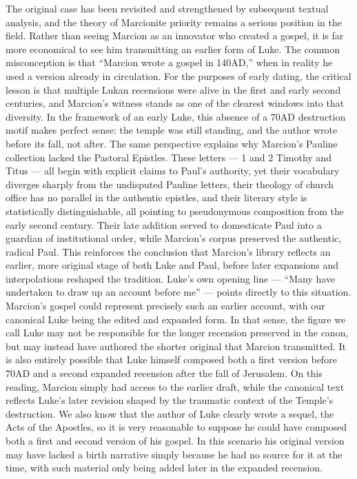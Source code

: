 The original case has been revisited and strengthened by subsequent textual analysis, and the theory of Marcionite priority remains a serious position in the field.
Rather than seeing Marcion as an innovator who created a gospel, it is far more economical to see him transmitting an earlier form of Luke.
The common misconception is that “Marcion wrote a gospel in 140AD,” when in reality he used a version already in circulation.
For the purposes of early dating, the critical lesson is that multiple Lukan recensions were alive in the first and early second centuries, and Marcion’s witness stands as one of the clearest windows into that diversity.
In the framework of an early Luke, this absence of a 70AD destruction motif makes perfect sense: the temple was still standing, and the author wrote before its fall, not after.
The same perspective explains why Marcion’s Pauline collection lacked the Pastoral Epistles.
These letters --- 1 and 2 Timothy and Titus --- all begin with explicit claims to Paul's authority, yet their vocabulary diverges sharply from the undisputed Pauline letters, their theology of church office has no parallel in the authentic epistles, and their literary style is statistically distinguishable, all pointing to pseudonymous composition from the early second century.
Their late addition served to domesticate Paul into a guardian of institutional order, while Marcion’s corpus preserved the authentic, radical Paul.
This reinforces the conclusion that Marcion’s library reflects an earlier, more original stage of both Luke and Paul, before later expansions and interpolations reshaped the tradition.
Luke’s own opening line --- “Many have undertaken to draw up an account before me” --- points directly to this situation.
Marcion’s gospel could represent precisely such an earlier account, with our canonical Luke being the edited and expanded form.
In that sense, the figure we call Luke may not be responsible for the longer recension preserved in the canon, but may instead have authored the shorter original that Marcion transmitted.
It is also entirely possible that Luke himself composed both a first version before 70AD and a second expanded recension after the fall of Jerusalem.
On this reading, Marcion simply had access to the earlier draft, while the canonical text reflects Luke’s later revision shaped by the traumatic context of the Temple’s destruction.
We also know that the author of Luke clearly wrote a sequel, the Acts of the Apostles, so it is very reasonable to suppose he could have composed both a first and second version of his gospel.
In this scenario his original version may have lacked a birth narrative simply because he had no source for it at the time, with such material only being added later in the expanded recension.

